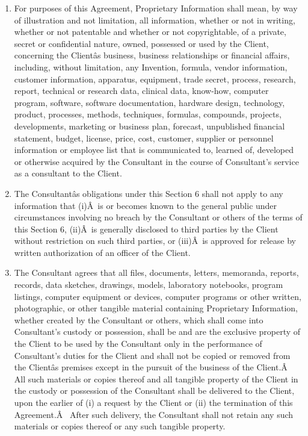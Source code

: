 \documentclass[12pt]{article}
\begin{document}
\begin{enumerate}
\begin{enumerate}
\begin{enumerate}[(1)]
            \item For purposes of this Agreement, Proprietary Information shall mean, by way of illustration and not limitation, all information, whether or not in writing, whether or not patentable and whether or not copyrightable, of a private, secret or confidential nature, owned, possessed or used by the Client, concerning the Clientâs business, business relationships or financial affairs, including, without limitation, any Invention, formula, vendor information, customer information, apparatus, equipment, trade secret, process, research, report, technical or research data, clinical data, know-how, computer program, software, software documentation, hardware design, technology, product, processes, methods, techniques, formulas, compounds, projects, developments, marketing or business plan, forecast, unpublished financial statement, budget, license, price, cost, customer, supplier or personnel information or employee list that is communicated to, learned of, developed or otherwise acquired by the Consultant in the course of Consultant's service as a consultant to the Client.
            \item The Consultantâs obligations under this Section 6 shall not apply to any information that (i)Â is or becomes known to the general public under circumstances involving no breach by the Consultant or others of the terms of this Section 6, (ii)Â is generally disclosed to third parties by the Client without restriction on such third parties, or (iii)Â is approved for release by written authorization of an officer of the Client.
            \item The Consultant agrees that all files, documents, letters, memoranda, reports, records, data sketches, drawings, models, laboratory notebooks, program listings, computer equipment or devices, computer programs or other written, photographic, or other tangible material containing Proprietary Information, whether created by the Consultant or others, which shall come into Consultant's custody or possession, shall be and are the exclusive property of the Client to be used by the Consultant only in the performance of Consultant's duties for the Client and shall not be copied or removed from the Clientâs premises except in the pursuit of the business of the Client.Â  All such materials or copies thereof and all tangible property of the Client in the custody or possession of the Consultant shall be delivered to the Client, upon the earlier of (i) a request by the Client or (ii) the termination of this Agreement.Â  After such delivery, the Consultant shall not retain any such materials or copies thereof or any such tangible property.

\end{enumerate}
\end{enumerate}
\end{enumerate}
\end{document}
